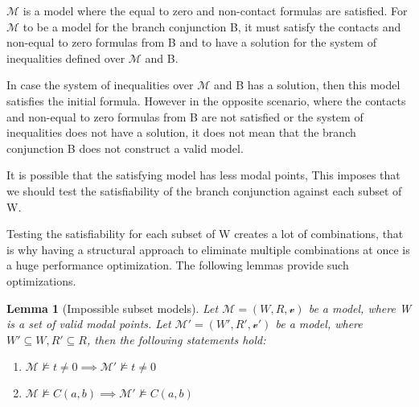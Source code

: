 \documentclass{article}
\newtheorem{lemma}[theorem]{Lemma}
\newcommand{\vE}{\mathscr{v}}
\begin{document}
	$\mathcal{M}$ is a model where the equal to zero and non-contact formulas are satisfied. For $\mathcal{M}$ to be a model for the branch conjunction B,
	it must satisfy the contacts and non-equal to zero formulas from B and to have a solution for the system of inequalities defined over $\mathcal{M}$ and B.

	In case the system of inequalities over $\mathcal{M}$ and B has a solution, then this model satisfies the initial formula.
	However in the opposite scenario, where the contacts and non-equal to zero formulas from B are not satisfied or the system of inequalities does not have a solution,
	it does not mean that the branch conjunction B does not construct a valid model.

	It is possible that the satisfying model has less modal points,
	This imposes that we should test the satisfiability of the branch conjunction against each subset of W.
	
	Testing the satisfiability for each subset of W creates a lot of combinations, that is why having a structural approach to eliminate 
	multiple combinations at once is a huge performance optimization. The following lemmas provide such optimizations.

	\begin{lemma}[Impossible subset models] \label{impossible-subset-models}
		Let $\mathcal{M} = (W, R, \vE)$ be a model, where W is a set of valid modal points.
		Let $\mathcal{M'} = (W', R', \vE')$ be a model, where $W' \subseteq W, R' \subseteq R$, then the following statements hold:
	\begin{enumerate}
		\item $\mathcal{M} \not\models t \neq 0 \implies \mathcal{M'} \not\models t \neq 0$
		\item $\mathcal{M} \not\models C(a,b) \implies \mathcal{M'} \not\models C(a,b)$
	\end{enumerate}
	\end{lemma}
\end{document}
